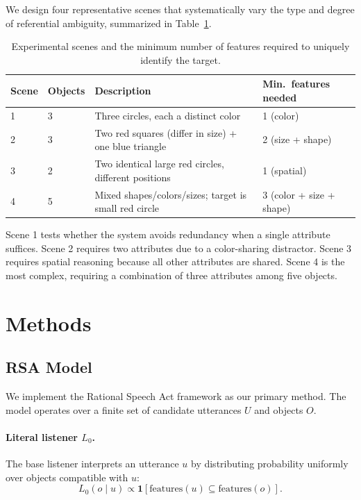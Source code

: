\documentclass[10pt]{article}
\begin{document}
We design four representative scenes that systematically vary the type and degree of referential ambiguity, summarized in Table~\ref{tab:scenes}.

\begin{table}[h]
\centering
\small
\begin{tabular}{llp{4.5cm}l}
\toprule
Scene & Objects & Description & Min.\ features needed \\
\midrule
1 & 3 & Three circles, each a distinct color & 1 (color) \\
2 & 3 & Two red squares (differ in size) + one blue triangle & 2 (size + shape) \\
3 & 2 & Two identical large red circles, different positions & 1 (spatial) \\
4 & 5 & Mixed shapes/colors/sizes; target is small red circle & 3 (color + size + shape) \\
\bottomrule
\end{tabular}
\caption{Experimental scenes and the minimum number of features required to uniquely identify the target.}
\label{tab:scenes}
\end{table}

Scene 1 tests whether the system avoids redundancy when a single attribute suffices. Scene 2 requires two attributes due to a color-sharing distractor. Scene 3 requires spatial reasoning because all other attributes are shared. Scene 4 is the most complex, requiring a combination of three attributes among five objects.

\section{Methods}

\subsection{RSA Model}

We implement the Rational Speech Act framework \cite{fried2017pragmatic} as our primary method. The model operates over a finite set of candidate utterances $U$ and objects $O$.

\paragraph{Literal listener $L_0$.} The base listener interprets an utterance $u$ by distributing probability uniformly over objects compatible with $u$:
\[
L_0(o \mid u) \propto \mathbf{1}[\text{features}(u) \subseteq \text{features}(o)].
\]
\end{document}
